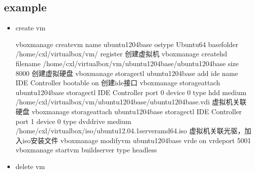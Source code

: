 \documentclass[a4paper,10pt,english]{sphinxmanual}
\begin{document}
\subsection{example}
\label{\detokenize{linux/virtualbox:example}}\begin{itemize}
\item {} 
create vm

\begin{sphinxVerbatim}[commandchars=\\\{\}]
vboxmanage createvm \PYGZhy{}\PYGZhy{}name \PYGZdq{}ubuntu1204\PYGZhy{}base\PYGZdq{} \PYGZhy{}\PYGZhy{}ostype \PYGZdq{}Ubuntu\PYGZus{}64\PYGZdq{} \PYGZhy{}\PYGZhy{}basefolder \PYGZdq{}/home/cxl/virtualbox/vm/\PYGZdq{} \PYGZhy{}\PYGZhy{}register 创建虚拟机
vboxmanage createhd \PYGZhy{}\PYGZhy{}filename /home/cxl/virtualbox/vm/ubuntu1204\PYGZhy{}base/ubuntu1204\PYGZhy{}base \PYGZhy{}\PYGZhy{}size 8000 创建虚拟硬盘
vboxmanage storagectl \PYGZdq{}ubuntu1204\PYGZhy{}base\PYGZdq{} \PYGZhy{}\PYGZhy{}add ide  \PYGZhy{}\PYGZhy{}name \PYGZdq{}IDE Controller\PYGZdq{} \PYGZhy{}\PYGZhy{}bootable on  创建ide接口
vboxmanage storageattach \PYGZdq{}ubuntu1204\PYGZhy{}base\PYGZdq{} \PYGZhy{}\PYGZhy{}storagectl \PYGZdq{}IDE Controller\PYGZdq{} \PYGZhy{}\PYGZhy{}port 0 \PYGZhy{}\PYGZhy{}device 0 \PYGZhy{}\PYGZhy{}type hdd \PYGZhy{}\PYGZhy{}medium \PYGZdq{}/home/cxl/virtualbox/vm/ubuntu1204\PYGZhy{}base/ubuntu1204\PYGZhy{}base.vdi\PYGZdq{} 虚拟机关联硬盘
vboxmanage storageattach \PYGZdq{}ubuntu1204\PYGZhy{}base\PYGZdq{} \PYGZhy{}\PYGZhy{}storagectl \PYGZdq{}IDE Controller\PYGZdq{} \PYGZhy{}\PYGZhy{}port 1 \PYGZhy{}\PYGZhy{}device 0 \PYGZhy{}\PYGZhy{}type dvddrive \PYGZhy{}\PYGZhy{}medium \PYGZdq{}/home/cxl/virtualbox/iso/ubuntu\PYGZhy{}12.04.1\PYGZhy{}server\PYGZhy{}amd64.iso\PYGZdq{} 虚拟机关联光驱，加入iso安装文件
vboxmanage modifyvm \PYGZdq{}ubuntu1204\PYGZhy{}base\PYGZdq{} \PYGZhy{}\PYGZhy{}vrde on \PYGZhy{}\PYGZhy{}vrdeport 5001
vboxmanage startvm \PYGZdq{}buildserver\PYGZdq{} \PYGZhy{}\PYGZhy{}type headless
\end{sphinxVerbatim}

\item {} 
delete vm

\begin{sphinxVerbatim}[commandchars=\\\{\}]
    
\end{sphinxVerbatim}


\end{itemize}
\end{document}
